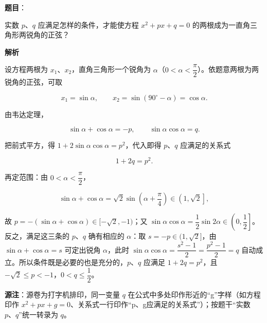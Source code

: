 \begin{answer}

\textbf{题目}：

实数 $p\text{、}q$ 应满足怎样的条件，才能使方程 $x^2+px+q=0$ 的两根成为一直角三角形两锐角的正弦？

\textbf{解析}

设方程两根为 $x_1\text{、}x_2$，直角三角形一个锐角为 $\alpha$（$0<\alpha<\dfrac\pi2$）。依题意两根为两锐角的正弦，可取

\nopagebreak[4]
\[
x_1=\sin\alpha,
\qquad
x_2=\sin(90^\circ-\alpha)=\cos\alpha.
\]

由韦达定理，

\nopagebreak[4]
\[
\sin\alpha+\cos\alpha=-p,
\qquad
\sin\alpha\cos\alpha=q.
\]

把前式平方，得 $1+2\sin\alpha\cos\alpha=p^2$，代入即得 $p\text{、}q$ 应满足的关系式

\nopagebreak[4]
\[
1+2q=p^2.
\]

再定范围：由 $0<\alpha<\dfrac\pi2$，

\nopagebreak[4]
\[
\sin\alpha+\cos\alpha=\sqrt2\sin\left(\alpha+\frac\pi4\right)\in\left(1,\sqrt2\right],
\]

故 $p=-(\sin\alpha+\cos\alpha)\in[-\sqrt2,-1)$；又 $\sin\alpha\cos\alpha=\dfrac12\sin2\alpha\in\left(0,\dfrac12\right]$。反之，满足这三条的 $p\text{、}q$ 确有相应的 $\alpha$：取 $s=-p\in(1,\sqrt2]$，由 $\sin\alpha+\cos\alpha=s$ 可定出锐角 $\alpha$，此时 $\sin\alpha\cos\alpha=\dfrac{s^2-1}{2}=\dfrac{p^2-1}{2}=q$ 自动成立。所以条件既是必要的也是充分的，$p\text{、}q$ 应满足 $1+2q=p^2$，且 $-\sqrt2\leqslant p<-1$，$0<q\leqslant\dfrac12$。

\begin{gktip}
\textbf{源注}：源卷为打字机排印，同一变量 $q$ 在公式中多处印作形近的“g”字样（如方程印作 $x^2+px+g=0$、关系式一行印作“p、g应满足的关系式”）；按题干“实数 $p\text{、}q$”统一转录为 $q$。
\end{gktip}


\end{answer}
